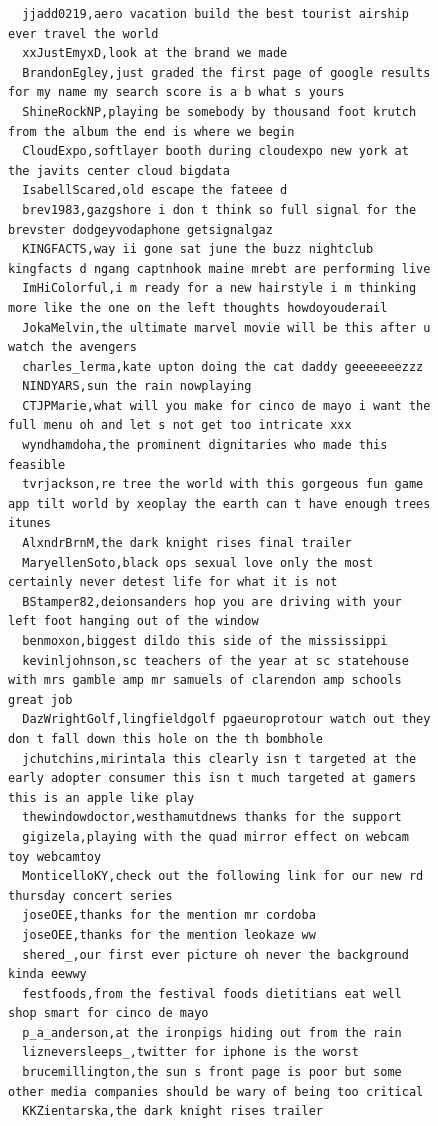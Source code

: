 \begin{figure}[htpb]
\begin{verbatim}
  jjadd0219,aero vacation build the best tourist airship ever travel the world
  xxJustEmyxD,look at the brand we made
  BrandonEgley,just graded the first page of google results for my name my search score is a b what s yours
  ShineRockNP,playing be somebody by thousand foot krutch from the album the end is where we begin
  CloudExpo,softlayer booth during cloudexpo new york at the javits center cloud bigdata
  IsabellScared,old escape the fateee d
  brev1983,gazgshore i don t think so full signal for the brevster dodgeyvodaphone getsignalgaz
  KINGFACTS,way ii gone sat june the buzz nightclub kingfacts d ngang captnhook maine mrebt are performing live
  ImHiColorful,i m ready for a new hairstyle i m thinking more like the one on the left thoughts howdoyouderail
  JokaMelvin,the ultimate marvel movie will be this after u watch the avengers
  charles_lerma,kate upton doing the cat daddy geeeeeeezzz
  NINDYARS,sun the rain nowplaying
  CTJPMarie,what will you make for cinco de mayo i want the full menu oh and let s not get too intricate xxx
  wyndhamdoha,the prominent dignitaries who made this feasible
  tvrjackson,re tree the world with this gorgeous fun game app tilt world by xeoplay the earth can t have enough trees itunes
  AlxndrBrnM,the dark knight rises final trailer
  MaryellenSoto,black ops sexual love only the most certainly never detest life for what it is not
  BStamper82,deionsanders hop you are driving with your left foot hanging out of the window
  benmoxon,biggest dildo this side of the mississippi
  kevinljohnson,sc teachers of the year at sc statehouse with mrs gamble amp mr samuels of clarendon amp schools great job
  DazWrightGolf,lingfieldgolf pgaeuroprotour watch out they don t fall down this hole on the th bombhole
  jchutchins,mirintala this clearly isn t targeted at the early adopter consumer this isn t much targeted at gamers this is an apple like play
  thewindowdoctor,westhamutdnews thanks for the support
  gigizela,playing with the quad mirror effect on webcam toy webcamtoy
  MonticelloKY,check out the following link for our new rd thursday concert series
  joseOEE,thanks for the mention mr cordoba
  joseOEE,thanks for the mention leokaze ww
  shered_,our first ever picture oh never the background kinda eewwy
  festfoods,from the festival foods dietitians eat well shop smart for cinco de mayo
  p_a_anderson,at the ironpigs hiding out from the rain
  lizneversleeps_,twitter for iphone is the worst
  brucemillington,the sun s front page is poor but some other media companies should be wary of being too critical
  KKZientarska,the dark knight rises trailer

\end{verbatim}
\end{figure}
